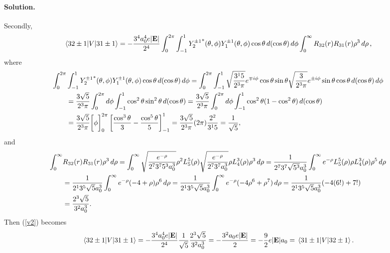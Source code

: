\documentclass[11pt]{article}
\newcommand{\refeq}[1]{(\ref{#1})}
\newcommand{\beq}{\begin{equation*}}
\newcommand{\eeq}{\end{equation*}}
\newcommand{\beqn}{\begin{equation}}
\newcommand{\eeqn}{\end{equation}}
\newenvironment{solution}
{
    \paragraph{Solution.}
    \ignorespaces
}
{
}
\begin{document}
\begin{solution}
	Secondly,
	\beqn \label{v2}
		\mel{3 2 \pm1}{V}{3 1 \pm1} = -\frac{3^4 \ao^4 e |\vE|}{2^4} \int_0^{2\pi} \int_{-1}^1 {Y_2^{\pm1}}^*(\tht, \phi) Y_1^{\pm1}(\tht, \phi) \cos\tht \dcost \dphi \int_0^\infty R_{3 2}(r) R_{3 1}(r) \rho^3 \drho,
	\eeqn
	where
	\begin{align*}
		\int_0^{2\pi} &\int_{-1}^1 {Y_2^{\pm1}}^*(\theta, \phi) Y_1^{\pm1}(\theta, \phi) \cos\theta \dd{(\cos\theta)} \dd{\phi}
		= \int_0^{2\pi} \int_{-1}^1 \sqrt{\frac{3^1 5}{2^3 \pi}} e^{\mp i \phi} \cos\theta \sin\theta \sqrt{\frac{3}{2^3 \pi}} e^{\pm i \phi} \sin\theta \cos\theta \dd{(\cos\theta)} \dd{\phi} \\
		&= \frac{3 \sqrt{5}}{2^3 \pi} \int_0^{2\pi} \dd{\phi} \int_{-1}^1 \cos^2\theta \sin^2\theta \dd{(\cos\theta)}
		= \frac{3 \sqrt{5}}{2^3 \pi} \int_0^{2\pi} \dd{\phi} \int_{-1}^1 \cos^2\theta (1 - \cos^2\theta) \dd{(\cos\theta)} \\
		&= \frac{3 \sqrt{5}}{2^3 \pi} \bigg[ \phi \bigg]_0^{2\pi} \left[ \frac{\cos^3\theta}{3} - \frac{\cos^5\theta}{5} \right]_{-1}^1
		= \frac{3 \sqrt{5}}{2^3 \pi} (2\pi) \frac{2^2}{3^1 5}
		= \frac{1}{\sqrt{5}},
	\end{align*}
	and
	\begin{align*}
		\int_0^\infty &R_{3 2}(r) R_{3 1}(r) \rho^3 \dd{\rho}
		= \int_0^\infty \sqrt{\frac{e^{-\rho}}{2^7 3^7 5^3 a_0^3}} \rho^2 L_5^5(\rho) \sqrt{\frac{e^{-\rho}}{2^7 3^7 a_0^3}} \rho L_4^3(\rho) \rho^3 \dd{\rho}
		= \frac{1}{2^7 3^7 \sqrt{5^3} a_0^3} \int_0^\infty e^{-\rho} L_5^5(\rho) \rho L_4^3(\rho) \rho^5 \dd{\rho} \\
		&= \frac{1}{2^1 3^5 \sqrt{5} a_0^3} \int_0^\infty e^{-\rho} (-4 + \rho) \rho^6 \dd{\rho}
		= \frac{1}{2^1 3^5 \sqrt{5} a_0^3} \int_0^\infty e^{-\rho} (-4 \rho^6 + \rho^7) \dd{\rho}
		= \frac{1}{2^1 3^5 \sqrt{5} a_0^3} (-4 (6!) + 7!) \\
		&= \frac{2^3 \sqrt{5}}{3^2 a_0^3}.
	\end{align*}
	Then \refeq{v2} becomes
	\beq
		\mel{3 2 \pm1}{V}{3 1 \pm1} = -\frac{3^4 \ao^4 e |\vE|}{2^4} \frac{1}{\sqrt{5}} \frac{2^3 \sqrt{5}}{3^2 \ao^3}
		= -\frac{3^2 \ao e |\vE|}{2}
		= -\frac{9}{2} e |\vE| \ao
		= \mel{3 1 \pm1}{V}{3 2 \pm1}.
	\eeq
	

\end{solution}
\end{document}

